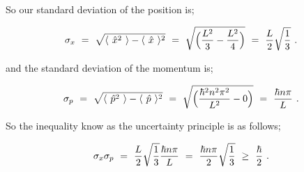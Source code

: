 \documentclass{article}
\begin{document}
So our standard deviation of the position is; 

\begin{equation} \label{eb-eq-254-4}
\sigma_{x} \hspace{0.125cm} = \hspace{0.125cm} \sqrt{\langle \hspace{0.125cm} \hat{x}^{2} \hspace{0.125cm} \rangle - \langle \hspace{0.125cm} \hat{x} \hspace{0.125cm} \rangle^{2}} \hspace{0.125cm} = \hspace{0.125cm} \sqrt{\Big( \frac{L^2}{3} - \frac{L^2}{4} \Big)} \hspace{0.125cm} = \hspace{0.125cm} \frac{L}{2} \sqrt{\frac{1}{3}}  \hspace{0.125cm} .
\end{equation}

and the standard deviation of the momentum is;

\begin{equation} \label{eb-eq-254-5}
\sigma_{p} \hspace{0.125cm} = \hspace{0.125cm} \sqrt{\langle \hspace{0.125cm} \hat{p}^{2} \hspace{0.125cm} \rangle - \langle \hspace{0.125cm} \hat{p} \hspace{0.125cm} \rangle^{2}} \hspace{0.125cm} = \hspace{0.125cm} \sqrt{\Big( \frac{\hbar^{2} n^2 \pi^2}{L^2} - 0 \Big)} \hspace{0.125cm} = \hspace{0.125cm} \frac{\hbar n \pi}{L}  \hspace{0.125cm} .
\end{equation}

So the inequality know as the uncertainty principle is as follows;

\begin{equation} \label{eb-eq-254-6}
\sigma_{x} \sigma_{p} \hspace{0.125cm} = \hspace{0.125cm} \frac{L}{2} \sqrt{\frac{1}{3}} \frac{\hbar n \pi}{L} \hspace{0.125cm} = \hspace{0.125cm} \frac{\hbar n \pi}{2} \sqrt{\frac{1}{3}} \hspace{0.125cm} \geq \hspace{0.125cm} \frac{ \hbar }{2} \hspace{0.125cm} .
\end{equation}
\end{document}
